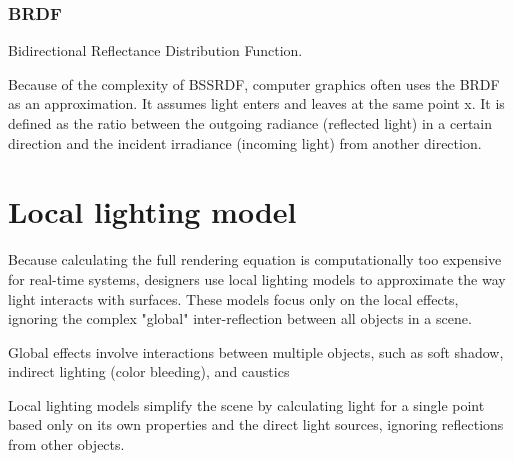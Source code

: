 \subsubsection{BRDF}
Bidirectional Reflectance Distribution Function.\par
Because of the complexity of BSSRDF, computer graphics often uses the BRDF as an approximation. It assumes light enters and leaves at the same point x. It is defined as the ratio between the outgoing radiance (reflected light) in a certain direction and the incident irradiance (incoming light) from another direction.

\section{Local lighting model}
Because calculating the full rendering equation is computationally too expensive for real-time systems, designers use local lighting models to approximate the way light interacts with surfaces. These models focus only on the local effects, ignoring the complex "global" inter-reflection between all objects in a scene.

\begin{definition}
    Global effects involve interactions between multiple objects, such as soft shadow, indirect lighting (color bleeding), and caustics
\end{definition}

\begin{definition}
    Local lighting models simplify the scene by calculating light for a single point based only on its own properties and the direct light sources, ignoring reflections from other objects.
\end{definition}

